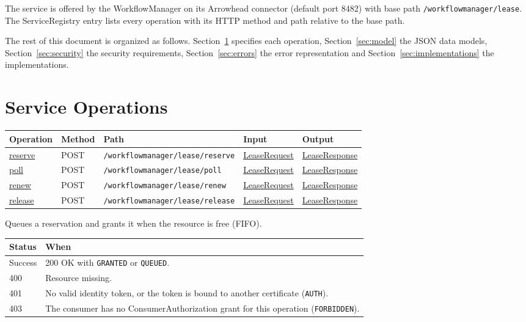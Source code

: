\documentclass[a4paper]{arrowhead}
\newcommand{\mref}[1]{{\textcolor{ArrowheadPurple}{\hyperref[sec:model:#1]{#1}}}}
\newcommand{\oref}[1]{{\textcolor{ArrowheadBlue}{\hyperref[sec:operations:#1]{#1}}}}
\begin{document}
The service is offered by the WorkflowManager on its Arrowhead connector (default port 8482) with base path \texttt{/\allowbreak{}workflowmanager/\allowbreak{}lease}.
The ServiceRegistry entry lists every operation with its HTTP method and path relative to the base path.

The rest of this document is organized as follows. Section~\ref{sec:operations} specifies each operation,
Section~\ref{sec:model} the JSON data models, Section~\ref{sec:security} the security requirements,
Section~\ref{sec:errors} the error representation and Section~\ref{sec:implementations} the implementations.

\newpage
\section{Service Operations}
\label{sec:operations}

{\small
\begin{longtable}{|p{3.0cm}|p{1.5cm}|p{5.3cm}|p{3.0cm}|p{3.0cm}|}

\hline
\rowcolor{gray!33} Operation & Method & Path & Input & Output \\ \hline
\endhead
\oref{reserve} & POST & \texttt{/\allowbreak{}workflowmanager/\allowbreak{}lease/\allowbreak{}reserve} & \mref{LeaseRequest} & \mref{LeaseResponse} \\ \hline
\oref{poll} & POST & \texttt{/\allowbreak{}workflowmanager/\allowbreak{}lease/\allowbreak{}poll} & \mref{LeaseRequest} & \mref{LeaseResponse} \\ \hline
\oref{renew} & POST & \texttt{/\allowbreak{}workflowmanager/\allowbreak{}lease/\allowbreak{}renew} & \mref{LeaseRequest} & \mref{LeaseResponse} \\ \hline
\oref{release} & POST & \texttt{/\allowbreak{}workflowmanager/\allowbreak{}lease/\allowbreak{}release} & \mref{LeaseRequest} & \mref{LeaseResponse} \\ \hline
\end{longtable}
}

Queues a reservation and grants it when the resource is free (FIFO).

{\small
\begin{longtable}{|p{2.0cm}|p{13.8cm}|}

\hline
\rowcolor{gray!33} Status & When \\ \hline
\endhead
Success & 200 OK with \texttt{GRANTED} or \texttt{QUEUED}. \\ \hline
400 & Resource missing. \\ \hline
401 & No valid identity token, or the token is bound to another certificate (\texttt{AUTH}). \\ \hline
403 & The consumer has no ConsumerAuthorization grant for this operation (\texttt{FORBIDDEN}). \\ \hline
\end{longtable}
}
\end{document}
